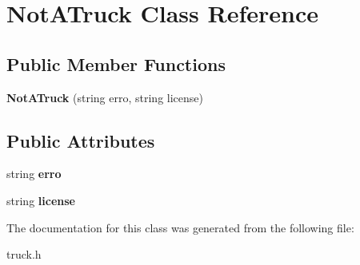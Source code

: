 \hypertarget{class_not_a_truck}{}\section{Not\+A\+Truck Class Reference}
\label{class_not_a_truck}
\subsection*{Public Member Functions}
\begin{DoxyCompactItemize}
\item 
\mbox{\label{class_not_a_truck_a52293d9e122db41dc3ff34d5e1019866}} 
{\bfseries Not\+A\+Truck} (string erro, string license)
\end{DoxyCompactItemize}
\subsection*{Public Attributes}
\begin{DoxyCompactItemize}
\item 
\mbox{\label{class_not_a_truck_ac9ff6b8470d3130eb3754f25dd97da72}} 
string {\bfseries erro}
\item 
\mbox{\label{class_not_a_truck_a274aa2458fcec7142ebff06fd23a10dc}} 
string {\bfseries license}
\end{DoxyCompactItemize}


The documentation for this class was generated from the following file\+:\begin{DoxyCompactItemize}
\item 
truck.\+h\end{DoxyCompactItemize}
